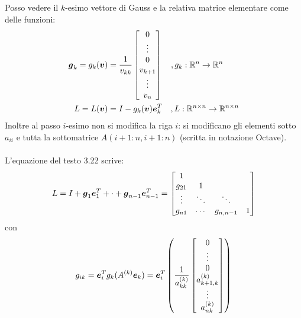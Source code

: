 \begin{oss}
Posso vedere il $k$-esimo vettore di Gauss e la relativa matrice elementare come 
delle funzioni:
\begin{displaymath}
\begin{split}
\boldsymbol{g}_{k} = g_{k}(\boldsymbol{v}) &= \frac{1}{v_{kk}} 
\begin{bmatrix}
0 \\ \vdots \\ 0 \\ v_{k + 1} \\ \vdots \\ v_{n}
\end{bmatrix} \quad , g_{k}: \mathbb{R}^{n} \rightarrow
\mathbb{R}^{n} \\
L = L(\boldsymbol{v}) &= I - g_{k}(\boldsymbol{v})\boldsymbol{e}_{k}^{T}  \quad , L:
\mathbb{R}^{n \times n} \rightarrow \mathbb{R}^{n \times n}
\end{split}
\end{displaymath}
Inoltre al passo $i$-esimo non si modifica la riga $i$: si modificano gli
elementi sotto $a_{ii}$ e tutta la sottomatrice $A(i + 1:n, i + 1:n)$ (scritta
in notazione Octave).
\\\\
L'equazione del testo 3.22 scrive:
\begin{displaymath}
L = I + \boldsymbol{g}_{1}\boldsymbol{e}_{1}^{T} + \cdot + \boldsymbol{g}_{n-1}\boldsymbol{e}_{n-1}^{T}
= \begin{bmatrix}
1 \\
g_{21} & 1 \\
\vdots & \ddots		& \ddots \\
g_{n1} & \cdots		&	g_{n,n-1}	& 1
\end{bmatrix}
\end{displaymath}
con 
\begin{displaymath}
g_{ik} = \boldsymbol{e}_{i}^{T} g_{k}(A^{(k)}\boldsymbol{e}_{k}) = 
\boldsymbol{e}_{i}^{T} \left ( \frac{1}{a_{kk}^{(k)}}
\begin{bmatrix}
0 \\ \vdots \\ 0 \\ a_{k + 1, k}^{(k)} \\ \vdots \\ a_{n k}^{(k)}
\end{bmatrix} \right )
\end{displaymath}
\end{oss}

